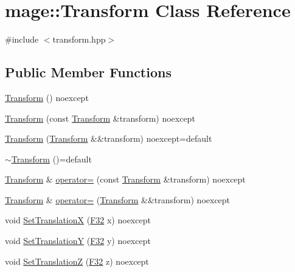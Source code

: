 \hypertarget{classmage_1_1_transform}{}\section{mage\+:\+:Transform Class Reference}
\label{classmage_1_1_transform}


{\ttfamily \#include $<$transform.\+hpp$>$}

\subsection*{Public Member Functions}
\begin{DoxyCompactItemize}
\item 
\mbox{\hyperlink{classmage_1_1_transform_a0fe54a3ac740025755d567a423c39de0}{Transform}} () noexcept
\item 
\mbox{\hyperlink{classmage_1_1_transform_aa26f3bb808d660ff5fccf594c0958386}{Transform}} (const \mbox{\hyperlink{classmage_1_1_transform}{Transform}} \&transform) noexcept
\item 
\mbox{\hyperlink{classmage_1_1_transform_a0d1081071df89ee1ec2640774107f66c}{Transform}} (\mbox{\hyperlink{classmage_1_1_transform}{Transform}} \&\&transform) noexcept=default
\item 
\mbox{\hyperlink{classmage_1_1_transform_a2da8c6542920e0748a504c32c54073f6}{$\sim$\+Transform}} ()=default
\item 
\mbox{\hyperlink{classmage_1_1_transform}{Transform}} \& \mbox{\hyperlink{classmage_1_1_transform_a5541fef38c72592a32c06fcbb2199d8d}{operator=}} (const \mbox{\hyperlink{classmage_1_1_transform}{Transform}} \&transform) noexcept
\item 
\mbox{\hyperlink{classmage_1_1_transform}{Transform}} \& \mbox{\hyperlink{classmage_1_1_transform_a7ed96cf9bc81595035537139c118efce}{operator=}} (\mbox{\hyperlink{classmage_1_1_transform}{Transform}} \&\&transform) noexcept
\item 
void \mbox{\hyperlink{classmage_1_1_transform_a99a7e4aaba6cee799bb014d9a1b5e227}{Set\+TranslationX}} (\mbox{\hyperlink{namespacemage_aa97e833b45f06d60a0a9c4fc22ae02c0}{F32}} x) noexcept
\item 
void \mbox{\hyperlink{classmage_1_1_transform_ae33a9ea844cac0bdb303e4e347e576c3}{Set\+TranslationY}} (\mbox{\hyperlink{namespacemage_aa97e833b45f06d60a0a9c4fc22ae02c0}{F32}} y) noexcept
\item 
void \mbox{\hyperlink{classmage_1_1_transform_a71009b20361c01c0ffbd981986d323e8}{Set\+TranslationZ}} (\mbox{\hyperlink{namespacemage_aa97e833b45f06d60a0a9c4fc22ae02c0}{F32}} z) noexcept

\end{DoxyCompactItemize}
